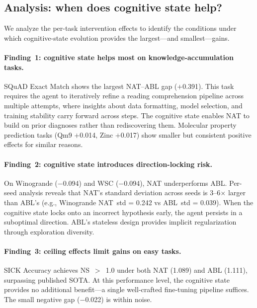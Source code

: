 \documentclass{article} %
\begin{document}
\subsection{Analysis: when does cognitive state help?}
\label{sec:boundary}

We analyze the per-task intervention effects to identify the conditions under
which cognitive-state evolution provides the largest---and smallest---gains.


\paragraph{Finding~1: cognitive state helps most on knowledge-accumulation
tasks.}
SQuAD Exact Match shows the largest NAT--ABL gap ($+$0.391). This task
requires the agent to iteratively refine a reading comprehension pipeline
across multiple attempts, where insights about data formatting, model
selection, and training stability carry forward across steps. The cognitive
state enables NAT to build on prior diagnoses rather than rediscovering them.
Molecular property prediction tasks (Qm9 $+$0.014, Zinc $+$0.017) show
smaller but consistent positive effects for similar reasons.

\paragraph{Finding~2: cognitive state introduces direction-locking risk.}
On Winogrande ($-$0.094) and WSC ($-$0.094), NAT underperforms ABL.
Per-seed analysis reveals that NAT's standard deviation across seeds is
3--6$\times$ larger than ABL's (e.g., Winogrande NAT~std = 0.242 vs
ABL~std = 0.039). When the cognitive state locks onto an incorrect hypothesis
early, the agent persists in a suboptimal direction. ABL's stateless design
provides implicit regularization through exploration diversity.

\paragraph{Finding~3: ceiling effects limit gains on easy tasks.}
SICK Accuracy achieves NS~$>$~1.0 under both NAT (1.089) and ABL (1.111),
surpassing published SOTA. At this performance level, the cognitive state
provides no additional benefit---a single well-crafted fine-tuning pipeline
suffices. The small negative gap ($-$0.022) is within noise.
\end{document}
